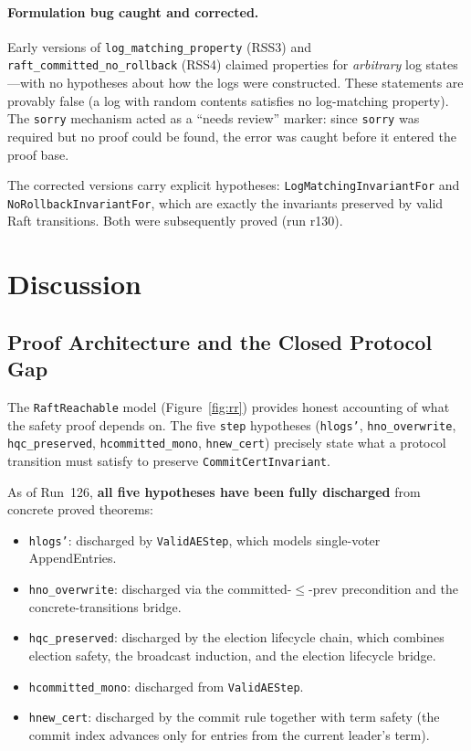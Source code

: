 \documentclass[sigconf,10pt]{acmart}
\begin{document}
\paragraph{Formulation bug caught and corrected.}
Early versions of \texttt{log\_matching\allowbreak\_property} (RSS3) and
\texttt{raft\_committed\allowbreak\_no\_rollback} (RSS4) claimed properties for
\emph{arbitrary} log states---with no hypotheses about how the logs were
constructed.  These statements are provably false (a log with random
contents satisfies no log-matching property).  The \texttt{sorry} mechanism
acted as a ``needs review'' marker: since \texttt{sorry} was required but
no proof could be found, the error was caught before it entered the proof
base.

The corrected versions carry explicit hypotheses:
\texttt{LogMatching\-InvariantFor} and
\texttt{NoRollback\-InvariantFor},
which are exactly the invariants preserved by valid Raft transitions.
Both were subsequently proved (run r130).

\section{Discussion}

\subsection{Proof Architecture and the Closed Protocol Gap}
\label{sec:reachability}

The \texttt{RaftReachable} model (Figure~\ref{fig:rr}) provides
honest accounting of what the safety proof depends on.  The five \texttt{step}
hypotheses (\texttt{hlogs'}, \texttt{hno\_overwrite}, \texttt{hqc\_preserved},
\texttt{hcommitted\_mono}, \texttt{hnew\_cert}) precisely state what a
protocol transition must satisfy to preserve \texttt{CommitCertInvariant}.

As of Run~126, \textbf{all five hypotheses have been fully discharged}
from concrete proved theorems:

\begin{itemize}\setlength\itemsep{0pt}
\item \texttt{hlogs'}: discharged by \texttt{ValidAEStep}, which models
  single-voter AppendEntries.
\item \texttt{hno\_overwrite}: discharged via the committed-$\leq$-prev
  precondition and the concrete-transitions bridge.
\item \texttt{hqc\_preserved}: discharged by the election lifecycle
  chain, which combines election safety, the broadcast induction,
  and the election lifecycle bridge.
\item \texttt{hcommitted\_mono}: discharged from
  \texttt{ValidAEStep}.
\item \texttt{hnew\_cert}: discharged by the commit rule
  together with term safety (the commit index
  advances only for entries from the current leader's term).
\end{itemize}
\end{document}
